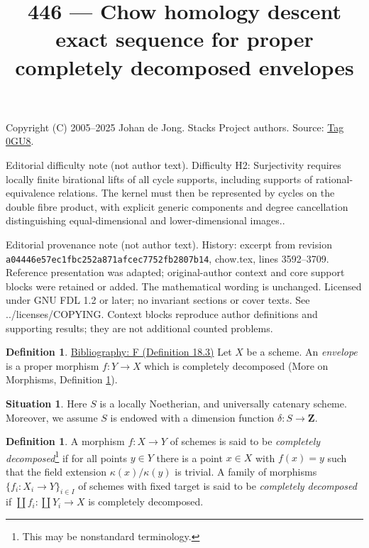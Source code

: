 \documentclass{amsart}
\newenvironment{reference}{\comment}{\endcomment}
\theoremstyle{plain}
\theoremstyle{definition}
\newtheorem{definition}[subsection]{Definition}
\newtheorem{situation}[subsection]{Situation}
\theoremstyle{remark}
\numberwithin{equation}{subsection}
\begin{document}
\title[Stacks Project, Tag 0GU8]{446 --- Chow homology descent exact sequence for proper completely decomposed envelopes}
\maketitle
\noindent Copyright (C) 2005--2025 Johan de Jong. Stacks Project authors. Source: \href{https://stacks.math.columbia.edu/tag/0GU8}{Tag 0GU8}.

\noindent Editorial difficulty note (not author text). Difficulty H2: Surjectivity requires locally finite birational lifts of all cycle supports, including supports of rational-equivalence relations. The kernel must then be represented by cycles on the double fibre product, with explicit generic components and degree cancellation distinguishing equal-dimensional and lower-dimensional images..

\noindent Editorial provenance note (not author text). History: excerpt from revision \texttt{a0444\allowbreak 6e57e\allowbreak c1fbc\allowbreak 252a8\allowbreak 71afc\allowbreak ec775\allowbreak 2fb28\allowbreak 07b14}, chow.tex, lines 3592--3709. Reference presentation was adapted; original-author context and core support blocks were retained or added. The mathematical wording is unchanged. Licensed under GNU FDL 1.2 or later; no invariant sections or cover texts. See ../licenses/COPYING. Context blocks reproduce author definitions and supporting results; they are not additional counted problems.

\begin{definition}
\label{definition-envelope}
\begin{reference}
\href{https://stacks.math.columbia.edu/bibliography}{Bibliography: F (Definition 18.3)}
\end{reference}
Let $X$ be a scheme. An {\it envelope} is a proper morphism $f : Y \to X$
which is completely decomposed
(More on Morphisms, Definition \ref{more-morphisms-definition-cd-morphism}).
\end{definition}

\begin{situation}
\label{situation-setup}
Here $S$ is a locally Noetherian, and universally catenary scheme.
Moreover, we assume $S$ is endowed with a dimension function
$\delta : S \longrightarrow \mathbf{Z}$.
\end{situation}

\begin{definition}
\label{more-morphisms-definition-cd-morphism}
A morphism $f : X \to Y$ of schemes is said to be
{\it completely decomposed}\footnote{This may be nonstandard terminology.}
if for all points $y \in Y$ there
is a point $x \in X$ with $f(x) = y$ such that the field
extension $\kappa(x)/\kappa(y)$ is trivial.
A family of morphisms $\{f_i : X_i \to Y\}_{i \in I}$ of
schemes with fixed target is said to be {\it completely decomposed}
if $\coprod f_i : \coprod Y_i \to X$ is completely decomposed.
\end{definition}
\end{document}
